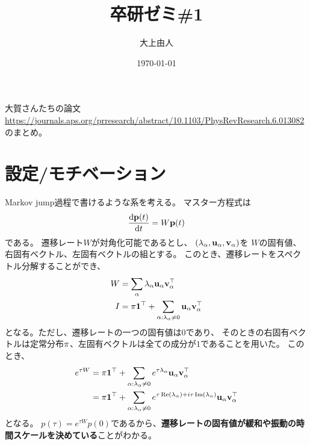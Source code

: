 \documentclass[a4paper,11pt]{jsarticle}
\numberwithin{equation}{section}
\begin{document}
\title{卒研ゼミ\#1}
\author{大上由人}
\date{\today}
\maketitle

大賀さんたちの論文\\
\url{https://journals.aps.org/prresearch/abstract/10.1103/PhysRevResearch.6.013082}
のまとめ。

\section{設定/モチベーション}
Markov jump過程で書けるような系を考える。
マスター方程式は
\begin{align}
    \dv{\vb{p}(t)}{t} = W \vb{p}(t)
\end{align}
である。
遷移レート${W}$が対角化可能であるとし、
$(\lambda_{\alpha}, \vb{u}_{\alpha}, \vb{v}_{\alpha})$を
${W}$の固有値、右固有ベクトル、左固有ベクトルの組とする。
このとき、遷移レートをスペクトル分解することができ、
\begin{align}
    W &= \sum_{\alpha} \lambda_{\alpha} \vb{u}_{\alpha} \vb{v}_{\alpha}^{\top}\\
    I &= \vb{\pi} \vb{1}^{\top} + \sum_{\alpha : \lambda_{\alpha} \neq 0} \vb{u}_{\alpha} \vb{v}_{\alpha}^{\top}
\end{align}
となる。ただし、遷移レートの一つの固有値は$0$であり、
そのときの右固有ベクトルは定常分布$\vb{\pi}$、左固有ベクトルは全ての成分が$1$であることを用いた。
このとき、
\begin{align}
    e^{\tau W} &= \vb{\pi} \vb{1}^{\top} + \sum_{\alpha : \lambda_{\alpha} \neq 0} e^{\tau \lambda_{\alpha}} \vb{u}_{\alpha} \vb{v}_{\alpha}^{\top}\\
    &= \vb{\pi} \vb{1}^{\top} + \sum_{\alpha : \lambda_{\alpha} \neq 0} e^{\tau \Re(\lambda_{\alpha}) + i \tau \Im(\lambda_{\alpha})} \vb{u}_{\alpha} \vb{v}_{\alpha}^{\top}
\end{align}
となる。
$p(\tau) = e^{\tau W} p(0)$であるから、\textbf{遷移レートの固有値が緩和や振動の時間スケールを決めている}ことがわかる。

\end{document}
